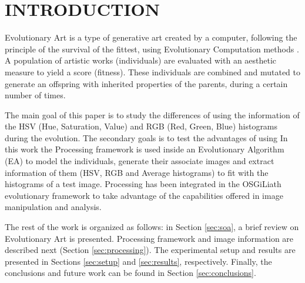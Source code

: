 \documentclass[a4paper,twoside]{article}
\begin{document}
\section{\uppercase{Introduction}}
\noindent Evolutionary Art \cite{EART} is a type of generative art \cite{PHEROGRAPHY} created by a
computer, following the principle of the survival of the fittest, %
using Evolutionary Computation methods \cite{INTROEIBEN}. A population
of artistic works (individuals) are evaluated with an aesthetic
measure to yield a score (fitness). These individuals are combined and
mutated to generate an offspring with inherited properties of the
parents, during a certain number of times. 

The main goal of this paper is to study the differences of using
the information of the HSV (Hue, Saturation, Value) and RGB (Red,
Green, Blue) histograms during the evolution.
The secondary goals is to test the advantages of using
In this work the Processing \cite{PROCESSING} framework is used inside an Evolutionary Algorithm (EA) to model the
individuals, generate their associate images and extract information
of them (HSV, RGB and Average histograms) to fit with the histograms
of a test image. Processing has been integrated in the OSGiLiath \cite{OSGILIATH} 
evolutionary framework to take advantage of the capabilities offered in image manipulation and analysis.



The rest of the work is organized as follows: in Section \ref{sec:soa}, a brief review on Evolutionary Art is presented. Processing framework and image information are described next (Section \ref{sec:processing}). The experimental setup and results are presented in Sections \ref{sec:setup} and \ref{sec:results}, respectively. Finally, the conclusions and future work can be found in Section \ref{sec:conclusions}.
\end{document}
